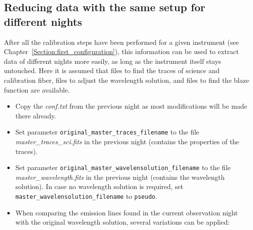 \documentclass[10pt,a4paper]{article}
\begin{document}
\subsection{Reducing data with the same setup for different nights}
\label{Section:further_configuration}
After all the calibration steps have been performed for a given instrument (see Chapter~\ref{Section:first_configuration}), this information can be used to extract data of different nights more easily, as long as the instrument itself stays untouched. Here it is assumed that files to find the traces of science and calibration fiber, files to adjust the wavelength solution, and files to find the blaze function are available.

\begin{itemize}
  \item Copy the \textit{conf.txt} from the previous night as most modifications will be made there already.
  
  \item Set parameter \verb|original_master_traces_filename| to the file \textit{master\_traces\_sci.fits} in the previous night (contains the properties of the traces).
  
  \item Set parameter \verb|original_master_wavelensolution_filename| to the file \textit{master\_wavelength.fits} in the previous night (contains the wavelength solution). In case no wavelength solution is required, set \verb|master_wavelensolution_filename| to \verb|pseudo|.
  
  \item When comparing the emission lines found in the current observation night with  the original wavelength solution, several variations can be applied:
  

\end{itemize}
\end{document}
